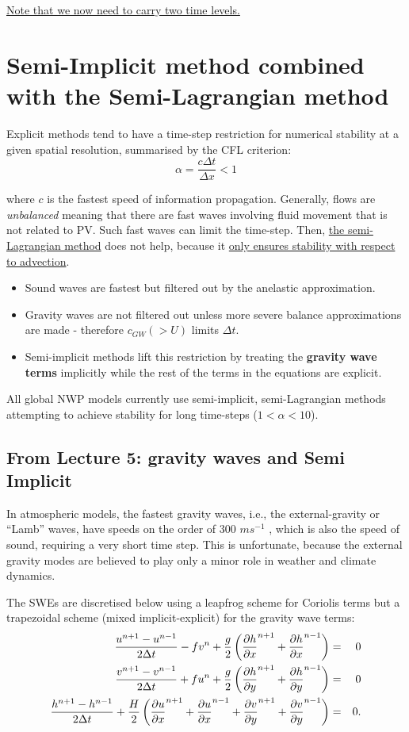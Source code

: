 	\underline{Note that we now need to carry two time levels.}
	

\section{Semi-Implicit method combined with the Semi-Lagrangian method}

Explicit methods tend to have a time-step restriction for numerical
stability at a given spatial resolution, summarised by the CFL criterion:
\[
\alpha=\frac{c \Delta t}{\Delta x}< 1
\]

where $c$ is the fastest speed of information propagation. Generally,
flows are {\em unbalanced} meaning that there are fast waves involving
fluid movement that is not related to PV. Such fast waves can limit
the time-step. Then, \underline{the semi-Lagrangian method} does not
help, because it \underline{only ensures stability with respect to advection}.

\begin{itemize}
\item
Sound waves are fastest but filtered out by the anelastic
approximation.

\item
Gravity waves are not filtered out unless more severe balance
approximations are made - therefore $c_{GW} (> U)$ limits $\Delta t$.

\item
Semi-implicit methods lift this restriction by treating the {\bf
gravity wave terms} implicitly while the rest of the terms in the equations are
explicit.
\end{itemize}

All global NWP models currently use semi-implicit, semi-Lagrangian
methods attempting to achieve stability for long time-steps ($1 < \alpha <
10$).


\subsection{From Lecture 5: gravity waves and Semi Implicit}

	In atmospheric models, the fastest gravity waves, i.e., the external-gravity or “Lamb” waves, have speeds on the order of 300 $m s^{-1}$ , which is also the speed of sound, requiring a very short time step. This is unfortunate, because the external gravity modes are believed to play only a minor role in weather and climate dynamics. 
	
The SWEs are discretised below
using a leapfrog scheme for Coriolis terms but a
trapezoidal scheme (mixed implicit-explicit) for the gravity wave
terms:
\begin{eqnarray*}
	\frac{u^{n+1}-u^{n-1}}{2\Delta t}-fv^n+\frac{g}{2}
	\left( \frac{\partial h}{\partial x}^{n+1} +\frac{\partial h}{\partial x}^{n-1} \right) & = & 0 \\
	\frac{v^{n+1}-v^{n-1}}{2\Delta t}+fu^n+\frac{g}{2}
	\left( \frac{\partial h}{\partial y}^{n+1} +\frac{\partial h}{\partial y}^{n-1} \right) & = & 0 \\
	\frac{h^{n+1}-h^{n-1}}{2\Delta t}+\frac{H}{2}
	\left( \frac{\partial u}{\partial x}^{n+1} +\frac{\partial u}{\partial x}^{n-1}
	+\frac{\partial v}{\partial y}^{n+1} +\frac{\partial v}{\partial y}^{n-1} 
	\right) & = & 0. 
\end{eqnarray*}

